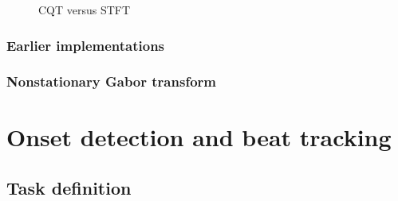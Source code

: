 \documentclass[letter,12pt,notitlepage]{article}
\begin{document}
\begin{figure}[ht]
	\vspace{0.1em}
	\hspace{0.35em}
	\caption{CQT versus STFT}
	\label{fig:cqtvstft}
\end{figure}

\subsubsection{Earlier implementations}

\subsubsection{Nonstationary Gabor transform}

\vfill
\clearpage

\section{Onset detection and beat tracking}
\label{sec:beattrack}

\subsection{Task definition}
\end{document}
